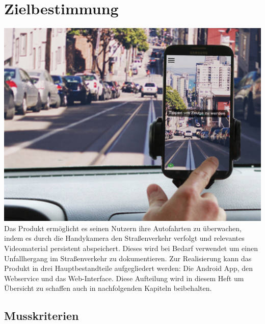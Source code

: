 \chapter{Zielbestimmung}

\includegraphics[width=\textwidth]{subtopicsFuncspec/Res//Mockups/Portrait_camera_view_car.jpg}\\[0.5cm]

Das Produkt ermöglicht es seinen Nutzern ihre Autofahrten zu überwachen, indem es durch die Handykamera den Straßenverkehr verfolgt und relevantes Videomaterial persistent abspeichert. Dieses wird bei Bedarf verwendet um einen Unfallhergang im Straßenverkehr zu dokumentieren.
Zur Realisierung kann das Produkt in drei Hauptbestandteile aufgegliedert werden: Die Android App, den Webservice und das Web-Interface. Diese Aufteilung wird in diesem Heft um Übersicht zu schaffen auch in nachfolgenden Kapiteln beibehalten.

\section{Musskriterien}
